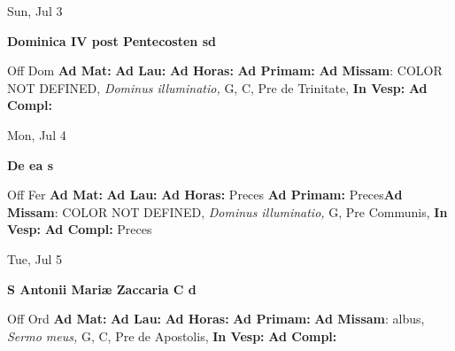 \documentclass[10pt]{book}
\begin{document}
\begin{center}
\begin{minipage}{3.5in}
\vspace{2em}
\begin{center}Sun, Jul 3
\end{center}
\textbf{ \large Dominica IV post Pentecosten
\textnormal{\normalsize sd}}

\begin{justify}Off Dom
\textbf{Ad Mat: }
\textbf{Ad Lau: }
\textbf{Ad Horas: }
\textbf{Ad Primam: }\textbf{Ad Missam}: COLOR NOT DEFINED, \textit{Dominus illuminatio,} G, C, Pre de Trinitate, 
\textbf{In Vesp: }
\textbf{Ad Compl: }
\end{justify}
\end{minipage}
\end{center}

\begin{center}
\begin{minipage}{3.5in}
\vspace{2em}
\begin{center}Mon, Jul 4
\end{center}
\textbf{ \large De ea
\textnormal{\normalsize s}}

\begin{justify}Off Fer
\textbf{Ad Mat: }
\textbf{Ad Lau: }
\textbf{Ad Horas: }Preces
\textbf{Ad Primam: }Preces\textbf{Ad Missam}: COLOR NOT DEFINED, \textit{Dominus illuminatio,} G, Pre Communis, 
\textbf{In Vesp: }
\textbf{Ad Compl: }Preces
\end{justify}
\end{minipage}
\end{center}

\begin{center}
\begin{minipage}{3.5in}
\vspace{2em}
\begin{center}Tue, Jul 5
\end{center}
\textbf{ \large S Antonii Mariæ Zaccaria C
\textnormal{\normalsize d}}

\begin{justify}Off Ord
\textbf{Ad Mat: }
\textbf{Ad Lau: }
\textbf{Ad Horas: }
\textbf{Ad Primam: }\textbf{Ad Missam}: albus, \textit{Sermo meus,} G, C, Pre de Apostolis, 
\textbf{In Vesp: }
\textbf{Ad Compl: }
\end{justify}
\end{minipage}
\end{center}
\end{document}
